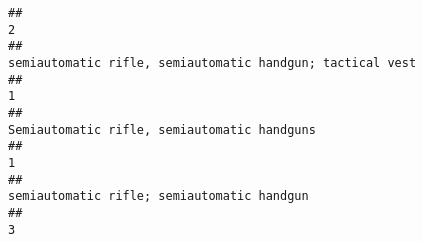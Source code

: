 \documentclass[
]{article}
\begin{document}
\begin{verbatim}
##                                                                                                                                                                                                                                                                                                                                                                                                     2 
##                                                                                                                                                                                                                                                                                                                                             semiautomatic rifle, semiautomatic handgun; tactical vest 
##                                                                                                                                                                                                                                                                                                                                                                                                     1 
##                                                                                                                                                                                                                                                                                                                                                           Semiautomatic rifle, semiautomatic handguns 
##                                                                                                                                                                                                                                                                                                                                                                                                     1 
##                                                                                                                                                                                                                                                                                                                                                            semiautomatic rifle; semiautomatic handgun 
##                                                                                                                                                                                                                                                                                                                                                                                                     3 

\end{verbatim}
\end{document}

